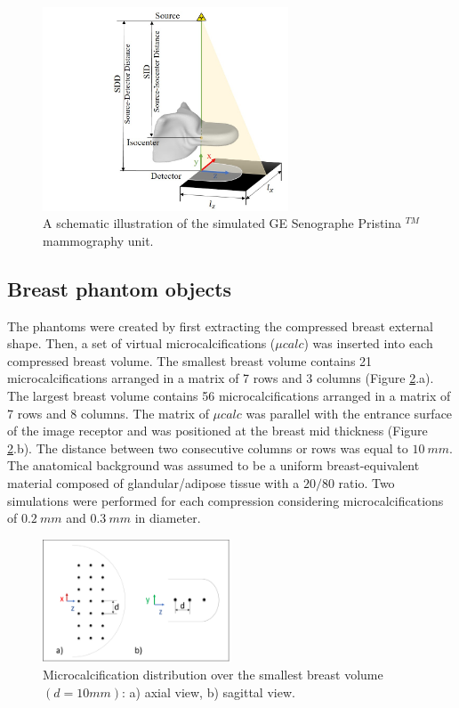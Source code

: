 \begin{figure}[!h]
\centering
\includegraphics[width=0.65\textwidth,keepaspectratio]{figures/systemgeometry.jpg} 
\caption{A schematic illustration of the simulated GE Senographe Pristina $^{TM}$ mammography unit.}
\label{fig:systemgeometry}
\end{figure}

\subsection{Breast phantom objects}

The phantoms were created by first extracting the compressed breast external shape. Then, a set of virtual microcalcifications ($\mu calc$) was inserted into each compressed breast volume. The smallest breast volume contains 21 microcalcifications arranged in a matrix of 7 rows and 3 columns (Figure \ref{fig:microcalcifications}.a). The largest breast volume contains 56 microcalcifications arranged in a matrix of 7 rows and 8 columns. The matrix of $\mu calc$ was parallel with the entrance surface of the image receptor and was positioned at the breast mid thickness (Figure \ref{fig:microcalcifications}.b). The distance between two consecutive columns or rows was equal to $10\ mm$. The anatomical background was assumed to be a uniform breast-equivalent material composed of glandular/adipose tissue with a $20/80$ ratio. Two simulations were performed for each compression considering microcalcifications of $0.2\ mm$ and $0.3\ mm$ in diameter.

\begin{figure}[!h]
\centering
\includegraphics[width=0.5\textwidth,keepaspectratio]{figures/microcalcifications.png} 
\caption{Microcalcification distribution over the smallest breast volume $(d=10mm)$: a) axial view, b) sagittal view.}\label{fig:microcalcifications}
\end{figure}


